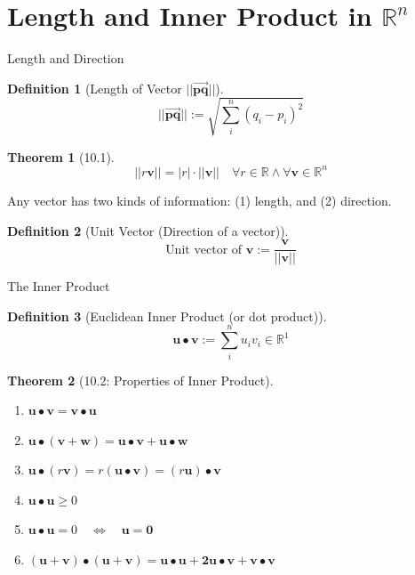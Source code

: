\documentclass[a4paper,11pt]{article}
\newtheorem{defn}{Definition}
\newtheorem{thm}{Theorem}
\begin{document}

\section{Length and Inner Product in $\mathbb{R}^n$} %
\label{sec:length_and_inner_product_in_mathbb_r_n}
\begin{frame}[t]{Length and Direction}
	\begin{defn}
		[Length of Vector $||\overrightarrow{\mathbf{pq}}||$]
		\[
			||\mathbf{\overrightarrow{pq}}|| := \sqrt{\sum_i^n (q_i-p_i)^2}
		\]
	\end{defn}
	\begin{thm}
		[10.1]\[
			||r\mathbf{v}||=|r|\cdot||\mathbf{v}|| \quad \forall r\in \mathbb{R}\land \forall\mathbf{v}\in\mathbb{R}^n
		\]
	\end{thm}
	Any vector has two kinds of information: (1) length, and  (2) direction. 
	\begin{defn}
		[Unit Vector (Direction of a vector)]
		\[
		\text{Unit vector of }\mathbf{v}:=\frac{\mathbf{v}}{||\mathbf{v}||}
		\]
	\end{defn}
\end{frame}

\begin{frame}[t]{The Inner Product}
	\begin{defn}
		[Euclidean Inner Product (or dot product)]
		\[
			\mathbf{u}\bullet\mathbf{v}:=\sum_i^n u_iv_i \in \mathbb{R}^1
		\]
	\end{defn}
	\begin{thm}
		[10.2: Properties of Inner Product]\begin{enumerate}
			\item $\mathbf{u\bullet v}=\mathbf{v\bullet u}$
			\item $\mathbf{u\bullet(v+w)}=\mathbf{u\bullet v + u\bullet w}$
			\item $\mathbf{u}\bullet(r\mathbf{v})=r(\mathbf{u\bullet v})=(r\mathbf{u})\bullet\mathbf{v}$
			\item $\mathbf{u\bullet u}\ge 0$
			\item $\mathbf{u\bullet u}=0\quad\iff\quad \mathbf{u}=\mathbf{0}$ 
			\item $\mathbf{(u+v)\bullet(u+v)=u\bullet u + 2 u\bullet v + v\bullet v}$
		\end{enumerate}
	\end{thm}
\end{frame}
\end{document}
